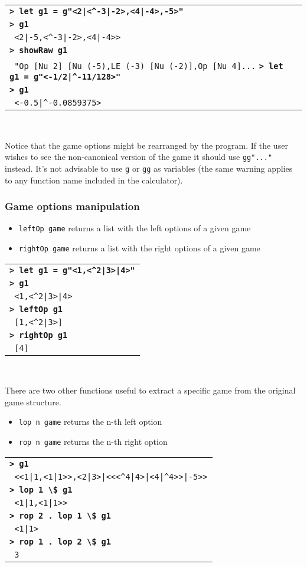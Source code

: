 \documentclass[a4paper,12pt]{article}
\newcommand{\bash}[1]{\small\textbf{\lstinline§> #1§}\\}
\newcommand{\out}[1]{\small\lstinline§ #1§}
\newcommand{\haskellCode}{\fontfamily{pcr}\selectfont}
\newenvironment{sgcode}
	{ \haskellCode
	  \begin{tabular}{|p{0.9\textwidth}|}
      \hline	
	}
	{ \\\hline  
      \end{tabular} \\
	  \par 
	}
\begin{document}
\begin{sgcode}
\bash{let g1 = g"<2|<^-3|-2>,<4|-4>,-5>"}
\bash{g1}
\out{<2|-5,<^-3|-2>,<4|-4>>} \\
\bash{showRaw g1}
\out{"Op [Nu 2] [Nu (-5),LE (-3) [Nu (-2)],Op [Nu 4]...}
\bash{let g1 = g"<-1/2|^-11/128>"}
\bash{g1}
\out{<-0.5|^-0.0859375>}
\end{sgcode}

Notice that the game options might be rearranged by the program. If the user
wishes to see the non-canonical version of the game it should use \verb|gg"..."|
instead. It's not advisable to use \verb|g| or \verb|gg| as variables (the same
warning applies to any function name included in the calculator).

\subsubsection{Game options manipulation}

\begin{itemize} \setlength\itemsep{0.1em}
  \item \verb|leftOp game| returns a list with the left options of a given game
  \item \verb|rightOp game| returns a list with the right options of a given game
\end{itemize}

\begin{sgcode}
\bash{let g1 = g"<1,<^2|3>|4>"}
\bash{g1}
\out{<1,<^2|3>|4>}\\
\bash{leftOp g1}
\out{[1,<^2|3>]} \\
\bash{rightOp g1}
\out{[4]}
\end{sgcode}

There are two other functions useful to extract a specific game from the original game structure.

\begin{itemize} \setlength\itemsep{0.1em}
  \item \verb|lop n game| returns the n-th left option
  \item \verb|rop n game| returns the n-th right option
\end{itemize}

\begin{sgcode}
\bash{g1}
\out{<<1|1,<1|1>>,<2|3>|<<<^4|4>|<4|^4>>|-5>>}\\
\bash{lop 1 \$ g1}
\out{<1|1,<1|1>>} \\
\bash{rop 2 . lop 1 \$ g1}
\out{<1|1>} \\
\bash{rop 1 . lop 2 \$ g1}
\out{3}
\end{sgcode}
\end{document}
